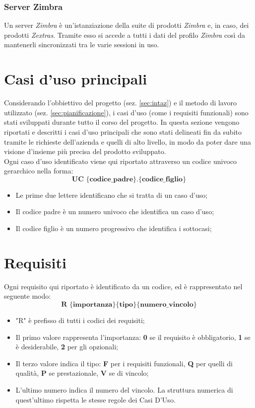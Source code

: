 \subsubsection{Server Zimbra}
Un server \emph{Zimbra} è un'istanziazione della suite di prodotti \emph{Zimbra} e, in caso, 
dei prodotti \emph{Zextras}. Tramite esso si accede a tutti i dati del profilo \emph{Zimbra} 
così da mantenerli sincronizzati tra le varie sessioni in uso.

\section{Casi d'uso principali}
Considerando l'obbiettivo del progetto (sez. \ref{sec:intaz}) e il metodo di 
lavoro utilizzato (sez. \ref{sec:pianificazione}), i casi d'uso (come i requisiti 
funzionali) sono stati sviluppati durante tutto il corso del progetto. 
In questa sezione vengono riportati e descritti i casi d'uso principali che 
sono stati delineati fin da subito tramite le richieste dell'azienda e quelli 
di alto livello, in modo da poter dare una visione d’insieme più precisa del 
prodotto sviluppato. \\

Ogni caso d'uso identificato viene qui riportato attraverso un codice univoco 
gerarchico nella forma:
$$ \textbf{UC \{codice\_padre\}.\{codice\_figlio\}  } $$
\begin{itemize}
	\item Le prime due lettere identificano che si tratta di un caso d'uso;
	\item Il codice padre è un numero univoco che identifica un caso d'uso;
	\item Il codice figlio è un numero progressivo che identifica i sottocasi;\\
\end{itemize}



\section{Requisiti}
Ogni requisito qui riportato è identificato da un codice, ed è rappresentato nel seguente modo:
$$ \textbf{R \{importanza\}\{tipo\}\{numero\_vincolo\} } $$

\begin{itemize}
	\item "R" è prefisso di tutti i codici dei requisiti;
	\item Il primo valore rappresenta l'importanza: \textbf{0} se il requisito è obbligatorio, \textbf{1} se è desiderabile, \textbf{2} per gli opzionali;
	\item Il terzo valore indica il tipo: \textbf{F} per i requisiti funzionali, \textbf{Q} per quelli di qualità, \textbf{P} se prestazionale, \textbf{V} se di vincolo;
	\item L'ultimo numero indica il numero del vincolo. La struttura numerica di quest'ultimo rispetta le stesse regole dei Casi D'Uso.
\end{itemize}


